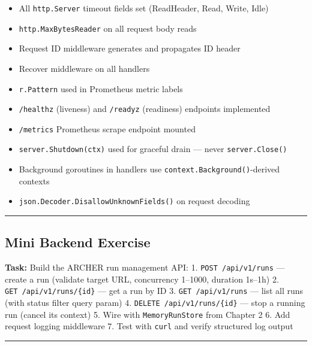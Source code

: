 \documentclass[
]{article}
\providecommand{\tightlist}{%
  \setlength{\itemsep}{0pt}\setlength{\parskip}{0pt}}
\begin{document}
\begin{itemize}
\tightlist
\item[$\square$]
  All \texttt{http.Server} timeout fields set (ReadHeader, Read, Write,
  Idle)
\item[$\square$]
  \texttt{http.MaxBytesReader} on all request body reads
\item[$\square$]
  Request ID middleware generates and propagates ID header
\item[$\square$]
  Recover middleware on all handlers
\item[$\square$]
  \texttt{r.Pattern} used in Prometheus metric labels
\item[$\square$]
  \texttt{/healthz} (liveness) and \texttt{/readyz} (readiness)
  endpoints implemented
\item[$\square$]
  \texttt{/metrics} Prometheus scrape endpoint mounted
\item[$\square$]
  \texttt{server.Shutdown(ctx)} used for graceful drain --- never
  \texttt{server.Close()}
\item[$\square$]
  Background goroutines in handlers use
  \texttt{context.Background()}-derived contexts
\item[$\square$]
  \texttt{json.Decoder.DisallowUnknownFields()} on request decoding
\end{itemize}

\begin{center}\rule{0.5\linewidth}{0.5pt}\end{center}

\hypertarget{mini-backend-exercise}{%
\subsection{Mini Backend Exercise}\label{mini-backend-exercise}}

\textbf{Task:} Build the ARCHER run management API: 1.
\texttt{POST\ /api/v1/runs} --- create a run (validate target URL,
concurrency 1--1000, duration 1s--1h) 2.
\texttt{GET\ /api/v1/runs/\{id\}} --- get a run by ID 3.
\texttt{GET\ /api/v1/runs} --- list all runs (with status filter query
param) 4. \texttt{DELETE\ /api/v1/runs/\{id\}} --- stop a running run
(cancel its context) 5. Wire with \texttt{MemoryRunStore} from Chapter 2
6. Add request logging middleware 7. Test with \texttt{curl} and verify
structured log output

\begin{center}\rule{0.5\linewidth}{0.5pt}\end{center}
\end{document}
